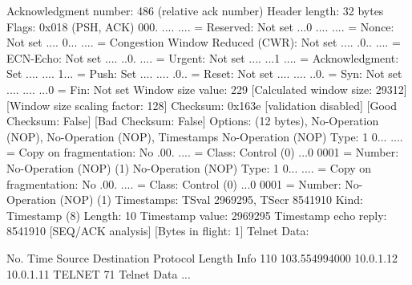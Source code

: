     Acknowledgment number: 486    (relative ack number)
    Header length: 32 bytes
    Flags: 0x018 (PSH, ACK)
        000. .... .... = Reserved: Not set
        ...0 .... .... = Nonce: Not set
        .... 0... .... = Congestion Window Reduced (CWR): Not set
        .... .0.. .... = ECN-Echo: Not set
        .... ..0. .... = Urgent: Not set
        .... ...1 .... = Acknowledgment: Set
        .... .... 1... = Push: Set
        .... .... .0.. = Reset: Not set
        .... .... ..0. = Syn: Not set
        .... .... ...0 = Fin: Not set
    Window size value: 229
    [Calculated window size: 29312]
    [Window size scaling factor: 128]
    Checksum: 0x163e [validation disabled]
        [Good Checksum: False]
        [Bad Checksum: False]
    Options: (12 bytes), No-Operation (NOP), No-Operation (NOP), Timestamps
        No-Operation (NOP)
            Type: 1
                0... .... = Copy on fragmentation: No
                .00. .... = Class: Control (0)
                ...0 0001 = Number: No-Operation (NOP) (1)
        No-Operation (NOP)
            Type: 1
                0... .... = Copy on fragmentation: No
                .00. .... = Class: Control (0)
                ...0 0001 = Number: No-Operation (NOP) (1)
        Timestamps: TSval 2969295, TSecr 8541910
            Kind: Timestamp (8)
            Length: 10
            Timestamp value: 2969295
            Timestamp echo reply: 8541910
    [SEQ/ACK analysis]
        [Bytes in flight: 1]
Telnet
    Data: 

No.     Time           Source                Destination           Protocol Length Info
    110 103.554994000  10.0.1.12             10.0.1.11             TELNET   71     Telnet Data ...

